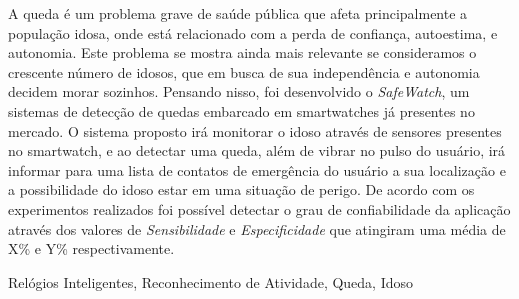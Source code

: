 A queda é um problema grave de saúde pública que afeta principalmente a população idosa, onde está relacionado com a perda de confiança, autoestima, e autonomia. Este problema se mostra ainda mais relevante se consideramos o crescente número de idosos, que em busca de sua independência e autonomia decidem morar sozinhos. Pensando nisso, foi desenvolvido o \textit{SafeWatch}, um sistemas de detecção de quedas embarcado em smartwatches já presentes no mercado. O sistema proposto irá monitorar o idoso através de sensores presentes no smartwatch, e ao detectar uma queda, além de vibrar no pulso do usuário, irá informar para uma lista de contatos de emergência do usuário a sua localização e a possibilidade do idoso estar em uma situação de perigo. De acordo com os experimentos realizados foi possível detectar o grau de confiabilidade da aplicação através dos valores de  \textit{Sensibilidade} e \textit{Especificidade} que atingiram uma média de X\% e Y\% respectivamente. 


\begin{keywords}
	Relógios Inteligentes, Reconhecimento de Atividade, Queda, Idoso
\end{keywords}